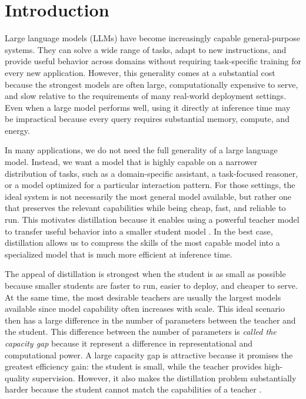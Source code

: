 \chapter{Introduction}

Large language models (LLMs) have become increasingly capable general-purpose systems. They can solve a wide range of tasks, adapt to new instructions, and provide useful behavior across domains without requiring task-specific training for every new application. However, this generality comes at a substantial cost because the strongest models are often large, computationally expensive to serve, and slow relative to the requirements of many real-world deployment settings. Even when a large model performs well, using it directly at inference time may be impractical because every query requires substantial memory, compute, and energy.

In many applications, we do not need the full generality of a large language model. Instead, we want a model that is highly capable on a narrower distribution of tasks, such as a domain-specific assistant, a task-focused reasoner, or a model optimized for a particular interaction pattern. For those settings, the ideal system is not necessarily the most general model available, but rather one that preserves the relevant capabilities while being cheap, fast, and reliable to run. This motivates distillation because it enables using a powerful teacher model to transfer useful behavior into a smaller student model \cite{hintonDistillingKnowledgeNeural2015}. In the best case, distillation allows us to compress the skills of the most capable model into a specialized model that is much more efficient at inference time.

The appeal of distillation is strongest when the student is as small as possible because smaller students are faster to run, easier to deploy, and cheaper to serve. At the same time, the most desirable teachers are usually the largest models available since model capability often increases with scale. This ideal scenario then has a large difference in the number of parameters between the teacher and the student. This difference between the number of parameters is \textit{called the capacity gap} because it represent a difference in representational and computational power. A large capacity gap is attractive because it promises the greatest efficiency gain: the student is small, while the teacher provides high-quality supervision. However, it also makes the distillation problem substantially harder because the student cannot match the capabilities of a teacher \cite{mirzadehImprovedKnowledgeDistillation2019, zhangLiftingCurseCapacity2023}.

